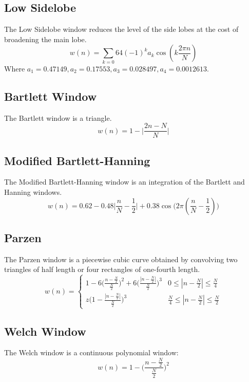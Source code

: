 \documentclass{article}
\theoremstyle{mystyle}
\begin{document}
\subsection{Low Sidelobe}
\noindent The Low Sidelobe window reduces the level of the side lobes at the cost of broadening the main lobe. 
\begin{equation}
w(n) = \sum_{k=0}6{4} (-1)^{k}a_{k}\cos(k\frac{2\pi n}{N})
\end{equation}
\noindent Where $a_1 = 0.47149, a_{2} = 0.17553, a_{3} = 0.028497, a_{4} = 0.0012613$.
\subsection{Bartlett Window}
\noindent The Bartlett window is a triangle.
\begin{equation}
w(n) = 1-\big|\frac{2n-N}{N}\big|
\end{equation}
\subsection{Modified Bartlett-Hanning}
\noindent The Modified Bartlett-Hanning window is an integration of the Bartlett and Hanning windows. 
\begin{equation}
w(n) = 0.62-0.48\big|\frac{n}{N}-\frac{1}{2}\big|+0.38\cos\big(2\pi(\frac{n}{N}-\frac{1}{2})\big)
\end{equation}
\subsection{Parzen}
\noindent The Parzen window is a piecewise cubic curve obtained by convolving two triangles of half length or four rectangles of one-fourth length.
\begin{equation}
w(n) = \begin{cases} 1 - 6\big(\frac{n-\frac{N}{2}}{\frac{N}{2}}\big)^2+6\big(\frac{|n-\frac{N}{2}|}{\frac{N}{2}}\big)^3 & 0 \leq |n-\frac{N}{2}| \leq \frac{N}{4} \\ z\big(1 - \frac{|n-\frac{N}{2}|}{\frac{N}{2}}\big)^3 & \frac{N}{4} \leq |n-\frac{N}{2}|\leq \frac{N}{2} \end{cases}
\end{equation}
\subsection{Welch Window}
The Welch window is a continuous polynomial window:
\begin{equation}
w(n) = 1-\big(\frac{n-\frac{N}{2}}{\frac{N}{2}}\big)^2
\end{equation}
\end{document}
